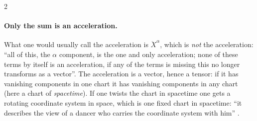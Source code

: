 \begin{paracol}{2}
\paragraph{Only the sum is an acceleration.} What one would usually call the acceleration is $\ddot X^\alpha$, which is \emph{not} the acceleration: ``all of this, the $\alpha$ component, is the one and only acceleration; none of these terms by itself is an acceleration, if any of the terms is missing this no longer transforms as a vector''. The acceleration is a vector, hence a tensor: if it has vanishing components in one chart it has vanishing components in any chart (here a chart of \emph{spacetime}). If one twists the chart in spacetime one gets a rotating coordinate system in space, which is one fixed chart in spacetime: ``it describes the view of a dancer who carries the coordinate system with him'' .


\end{paracol}
